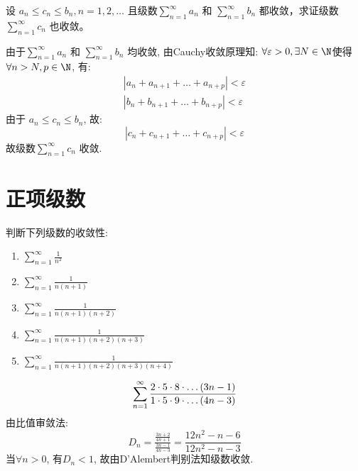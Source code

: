 \begin{problem}
    设 \(a_n \leq c_n \leq b_n, n = 1, 2, \dots\)
    且级数\(\sum_{n=1}^{\infty} a_n\) 和 \(\sum_{n=1}^{\infty}
    b_n\) 都收敛，求证级数
    \(\sum_{n=1}^{\infty} c_n\) 也收敛。
\end{problem}

\begin{solution}
    由于\(\sum_{n=1}^{\infty} a_{n}\) 和 \(\sum_{n=1}^{\infty} b_{n}\)
    均收敛, 由Cauchy收敛原理知: \(\forall \varepsilon > 0, \exists N \in
    \N\)使得\(\forall n > N, p \in \N\), 有:
    \begin{align*}
        \left| a_{n} + a_{n+1} + \dots + a_{n+p} \right| <
        \varepsilon \\
        \left| b_{n} + b_{n+1} + \dots + b_{n+p} \right| < \varepsilon
    \end{align*}
    由于
    \(a_{n} \leq c_{n} \leq b_{n}\), 故:
    \[
        \left| c_{n} + c_{n+1} + \dots + c_{n+p} \right| < \varepsilon
    \]
    故级数\(\sum_{n=1}^{\infty} c_{n}\) 收敛.
\end{solution}

\begin{problem}

\end{problem}

\section{正项级数}
\begin{problem}
    判断下列级数的收敛性:
    \begin{enumerate}
        \item \(\sum_{n=1}^{\infty} \frac{1}{n^2}\)
        \item \(\sum_{n=1}^{\infty} \frac{1}{n(n+1)}\)
        \item \(\sum_{n=1}^{\infty} \frac{1}{n(n+1)(n+2)}\)
        \item \(\sum_{n=1}^{\infty} \frac{1}{n(n+1)(n+2)(n+3)}\)
        \item \(\sum_{n=1}^{\infty} \frac{1}{n(n+1)(n+2)(n+3)(n+4)}\)
    \end{enumerate}
\end{problem}
\[
    \sum_{n=1}^{\infty} \frac{2 \cdot 5 \cdot 8 \cdot \dots
    (3n-1)}{1 \cdot 5 \cdot 9 \cdot \dots (4n-3)} \\
\]
由比值审敛法:
\[
    D_{n} = \tfrac{\tfrac{3n+2}{4n+1}}{\tfrac{3n-1}{4n-3}} =
    \frac{12n^{2}-n-6}{12n^{2}-n-3}
\]
当\(\forall n > 0\), 有\(D_{n} < 1\), 故由D'Alembert判别法知级数收敛.

